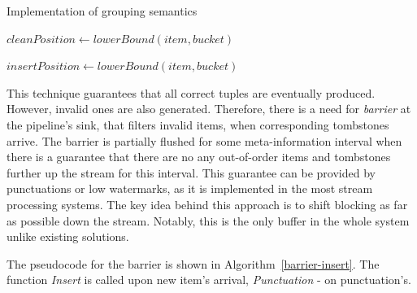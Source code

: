 \begin{algorithm}
\caption{Implementation of grouping semantics}
\label{group-insert}
  \begin{algorithmic}[1]
      \State $cleanPosition \gets lowerBound(item, bucket)$
        \State {}
      \EndFor

      \State {}

        \State {} 
      \EndFor
    \EndFunction

    \State

      \State $insertPosition \gets lowerBound(item, bucket)$
        \State {} 
      \EndFor
      
      \State {}

        \State {} 
      \EndFor
    \EndFunction
  \end{algorithmic}
\end{algorithm}

This technique guarantees that all correct tuples are eventually produced. However, invalid ones are also generated. Therefore, there is a need for {\it barrier} at the pipeline's sink, that filters invalid items, when corresponding tombstones arrive. The barrier is partially flushed for some meta-information interval when there is a guarantee that there are no any out-of-order items and tombstones further up the stream for this interval. This guarantee can be provided by punctuations or low watermarks, as it is implemented in the most stream processing systems. The key idea behind this approach is to shift blocking as far as possible down the stream. Notably, this is the only buffer in the whole system unlike existing solutions.

The pseudocode for the barrier is shown in Algorithm~\ref{barrier-insert}. The function {\it Insert} is called upon new item's arrival, {\it Punctuation} - on punctuation's. 

